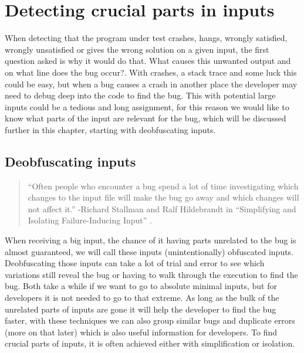 \chapter{Detecting crucial parts in inputs}
\label{cha:4:crucialParts}
\label{inputReduction:intro}
When detecting that the program under test crashes, hangs, wrongly satisfied, wrongly unsatisfied or gives the wrong solution on a given input, the first question asked is why it would do that. What causes this unwanted output and on what line does the bug occur?. 
With crashes, a stack trace and some luck this could be easy, but when a bug causes a crash in another place the developer may need to debug deep into the code to find the bug. 
This with potential large inputs could be a tedious and long assignment, for this reason we would like to know what parts of the input are relevant for the bug, which will be discussed further in this chapter, starting with deobfuscating inputs.



\section{Deobfuscating inputs}
\label{inputReduction:Deobfuscating}
\begin{quote}
	“Often people who encounter a bug spend a lot of time investigating which changes to the input file will make the bug go away and which changes will not affect it.” 
	\newline
	-Richard Stallman and Ralf Hildebrandt in “Simplifying and Isolating Failure-Inducing Input” \cite{5zeller2002simplifyingIsolatingFailure-inducing}.
\end{quote} 
When receiving a big input, the chance of it having parts unrelated to the bug is almost guaranteed, we will call these inputs (unintentionally) obfuscated inputs. Deobfuscating those inputs can take a lot of trial and error to see which variations still reveal the bug or having to walk through the execution to find the bug. Both take a while if we want to go to absolute minimal inputs, but for developers it is not needed to go to that extreme. As long as the bulk of the unrelated parts of inputs are gone it will help the developer to find the bug faster, with these techniques we can also group similar bugs and duplicate errors (more on that later) which is also useful information for developers. To find crucial parts of inputs, it is often achieved either with simplification or isolation. 

